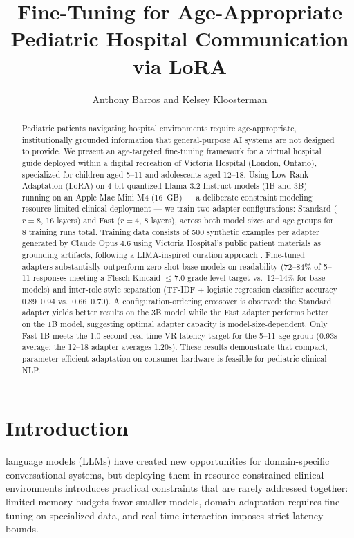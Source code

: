 \documentclass[journal]{IEEEtai}
\begin{document}
\title{Fine-Tuning for Age-Appropriate Pediatric Hospital Communication via LoRA}


\author{Anthony Barros and Kelsey Kloosterman}

\maketitle

\begin{abstract}
Pediatric patients navigating hospital environments require age-appropriate, institutionally grounded information that general-purpose AI systems are not designed to provide. We present an age-targeted fine-tuning framework for a virtual hospital guide deployed within a digital recreation of Victoria Hospital (London, Ontario), specialized for children aged 5--11 and adolescents aged 12--18. Using Low-Rank Adaptation (LoRA) on 4-bit quantized Llama 3.2 Instruct models (1B and 3B) running on an Apple Mac Mini M4 (16~GB) --- a deliberate constraint modeling resource-limited clinical deployment --- we train two adapter configurations: Standard ($r=8$, 16 layers) and Fast ($r=4$, 8 layers), across both model sizes and age groups for 8 training runs total. Training data consists of 500 synthetic examples per adapter generated by Claude Opus 4.6 using Victoria Hospital's public patient materials as grounding artifacts, following a LIMA-inspired curation approach \cite{zhou2023lima}. Fine-tuned adapters substantially outperform zero-shot base models on readability (72--84\% of 5--11 responses meeting a Flesch-Kincaid $\leq 7.0$ grade-level target vs.\ 12--14\% for base models) and inter-role style separation (TF-IDF + logistic regression classifier accuracy 0.89--0.94 vs.\ 0.66--0.70). A configuration-ordering crossover is observed: the Standard adapter yields better results on the 3B model while the Fast adapter performs better on the 1B model, suggesting optimal adapter capacity is model-size-dependent. Only Fast-1B meets the 1.0-second real-time VR latency target for the 5--11 age group (0.93s average; the 12--18 adapter averages 1.20s). These results demonstrate that compact, parameter-efficient adaptation on consumer hardware is feasible for pediatric clinical NLP.
\end{abstract}

\section{Introduction}

 language models (LLMs) have created new opportunities for domain-specific conversational systems, but deploying them in resource-constrained clinical environments introduces practical constraints that are rarely addressed together: limited memory budgets favor smaller models, domain adaptation requires fine-tuning on specialized data, and real-time interaction imposes strict latency bounds.
\end{document}
